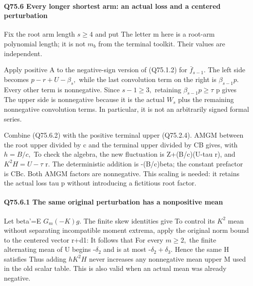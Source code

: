 \paragraph{Q75.6 Every longer shortest arm: an actual loss and a centered perturbation}

Fix the root arm length \(s\ge 4\) and put
The letter m here is a root-arm polynomial length; it is not \(m_b\)
from the terminal toolkit. Their values are independent.

Apply positive A to the negative-sign version of (Q75.1.2) for \(\bar f_{s-1}.\)
The left side becomes \(p-r+U-\beta_s,\allowbreak \) while the last convolution
term on the right is \(\beta_{s-1}p.\) Every other term is nonnegative.
Since \(s-1\ge 3,\allowbreak \) retaining \(\beta_{s-1}p\ge \tau\) p gives
The upper side is nonnegative because it is the actual \(W_s\) plus
the remaining nonnegative convolution terms. In particular, it is
not an arbitrarily signed formal series.

Combine (Q75.6.2) with the positive terminal upper (Q75.2.4). AMGM between
the root upper divided by c and the terminal upper divided by CB
gives, with \(h=B/c,\allowbreak \)
To check the algebra, the new fluctuation is
Z+(B/c)(U-tau r), and \(K^2H=U-\tau\) r. The deterministic addition
is -(B/c)beta; the constant prefactor is CBc. Both AMGM factors
are nonnegative. This scaling is needed: it retains the actual
loss tau p without introducing a fictitious root factor.

\paragraph{Q75.6.1 The same original perturbation has a nonpositive mean}

Let beta'=E \(G_m(-K)g.\) The finite skew identities give
To control its \(K^2\) mean without separating incompatible moment extrema,
apply the original norm bound to the centered vector r+d1:
It follows that
For every \(m\ge 2,\allowbreak \) the finite alternating mean of U begins -\(\delta_2\) and
is at most -\(\delta_2+\delta_3.\) Hence the same H satisfies
Thus adding \(hK^2H\) never increases any nonnegative mean upper M used
in the old scalar table. This is also valid when an actual mean was
already negative.

